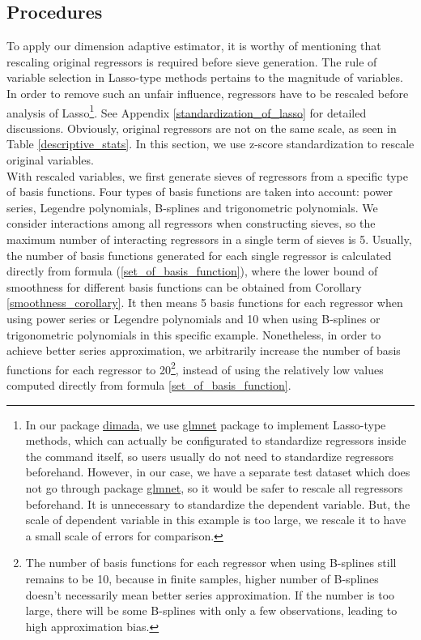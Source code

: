\documentclass[12pt, a4paper]{article}
\theoremstyle{MAstyle} \newtheorem{assumption}{Assumption}[section]
\theoremstyle{MAstyle} \newtheorem{definition}{Definition}[section]
\theoremstyle{MAstyle} \newtheorem{theorem}{Theorem}[section]
\theoremstyle{MAstyle} \newtheorem{corollary}{Corollary}[section]
\begin{document}
            \subsection{Procedures}
            To apply our dimension adaptive estimator, it is worthy of mentioning that rescaling original regressors is required before sieve generation. The rule of variable selection in Lasso-type methods pertains to the magnitude of variables. In order to remove such an unfair influence, regressors have to be rescaled before analysis of Lasso\footnote{In our package \href{https://github.com/ccfang2/dimada}{dimada}, we use \href{https://glmnet.stanford.edu/}{glmnet} package to implement Lasso-type methods, which can actually be configurated to standardize regressors inside the command itself, so users usually do not need to standardize regressors beforehand. However, in our case, we have a separate test dataset which does not go through package \href{https://glmnet.stanford.edu/}{glmnet}, so it would be safer to rescale all regressors beforehand. It is unnecessary to standardize the dependent variable. But, the scale of dependent variable in this example is too large, we rescale it to have a small scale of errors for comparison.}. See Appendix \ref{standardization_of_lasso} for detailed discussions. Obviously, original regressors are not on the same scale, as seen in Table \ref{descriptive_stats}. In this section, we use z-score standardization to rescale original variables.\\
        
            With rescaled variables, we first generate sieves of regressors from a specific type of basis functions. Four types of basis functions are taken into account: power series, Legendre polynomials, B-splines and trigonometric polynomials. We consider interactions among all regressors when constructing sieves, so the maximum number of interacting regressors in a single term of sieves is 5. Usually, the number of basis functions generated for each single regressor is calculated directly from formula (\ref{set_of_basis_function}), where the lower bound of smoothness for different basis functions can be obtained from Corollary \ref{smoothness_corollary}. It then means 5 basis functions for each regressor when using power series or Legendre polynomials and 10 when using B-splines or trigonometric polynomials in this specific example. Nonetheless, in order to achieve better series approximation, we arbitrarily increase the number of basis functions for each regressor to 20\footnote{The number of basis functions for each regressor when using B-splines still remains to be 10, because in finite samples, higher number of B-splines doesn't necessarily mean better series approximation. If the number is too large, there will be some B-splines with only a few observations, leading to high approximation bias.}, instead of using the relatively low values computed directly from formula \ref{set_of_basis_function}. \\
        
\end{document}
